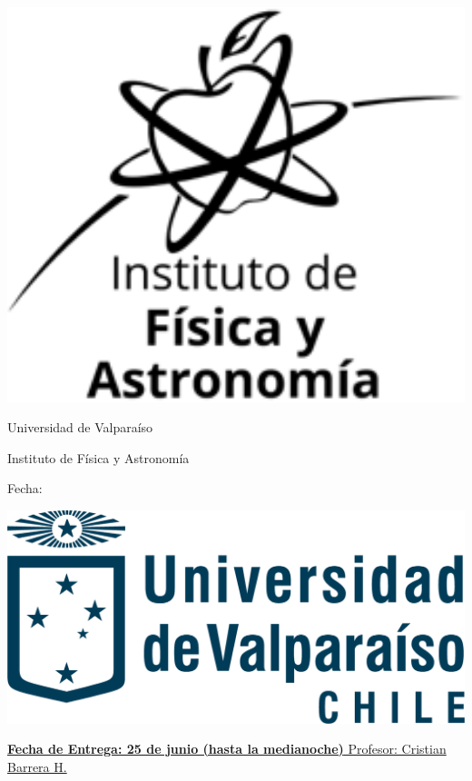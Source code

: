 	\noindent
	\begin{minipage}[l]{0.1\textwidth}
		\noindent
		\includegraphics[width=1.1\textwidth]{../logos/logo_ifa.png}
	\end{minipage}
\hfill
\begin{minipage}[c]{0.7\textwidth}
	\begin{center}
	{\large	Universidad de Valpara\'iso \par
	 \large Instituto de F\'isica y Astronom\'ia \par
	 \large \textbf{\examtitle}	\par
	 \large \textbf{\coursename}	\par
   \small	Fecha: \examdate}
	\end{center}
\end{minipage}
\hfill
	\begin{minipage}[r]{0.1\textwidth}
		\noindent
		\includegraphics[width=2.0\textwidth]{../logos/logo_uv.png}
	\end{minipage}
\par
\vspace{0.2in}
\noindent
\uline{\textbf{Fecha de Entrega: 25 de junio (hasta la medianoche)}
  \hfill Profesor: Cristian Barrera H.}
\par 
\vspace{0.15in}


\vspace{0.15in}

\noindent
\centering
